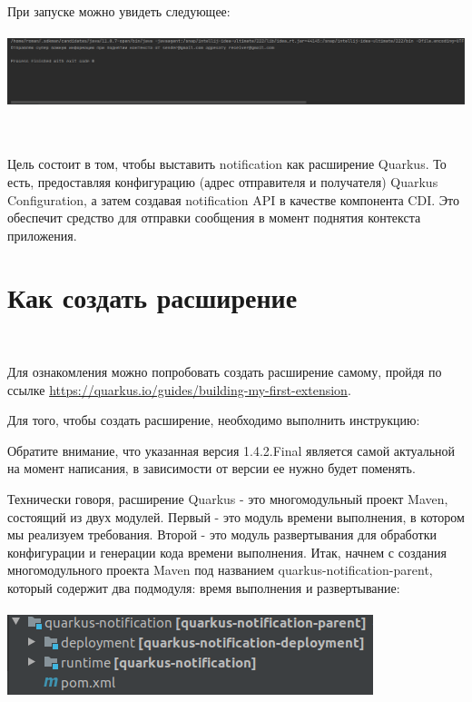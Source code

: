 \documentclass[russian,11pt]{article}
\begin{document}
При запуске можно увидеть следующее:

\paragraph{\includegraphics[scale=1.5, width=\textwidth]{2}}

~

Цель состоит в том, чтобы выставить notification как расширение Quarkus. То есть, предоставляя конфигурацию (адрес отправителя и получателя) Quarkus Configuration, а затем создавая notification  API в качестве компонента CDI. Это обеспечит средство для отправки сообщения в момент поднятия контекста приложения.

\section{Как создать расширение}
~

Для ознакомления можно попробовать создать расширение самому, пройдя по ссылке \url{https://quarkus.io/guides/building-my-first-extension}.
	
	Для того, чтобы создать расширение, необходимо выполнить инструкцию:



Обратите внимание, что указанная версия 1.4.2.Final является самой актуальной на момент написания, в зависимости от версии ее нужно будет поменять.

	Технически говоря, расширение Quarkus - это многомодульный проект Maven, состоящий из двух модулей. Первый - это модуль времени выполнения, в котором мы реализуем требования. Второй - это модуль развертывания для обработки конфигурации и генерации кода времени выполнения. Итак, начнем с создания многомодульного проекта Maven под названием quarkus-notification-parent, который содержит два подмодуля: время выполнения и развертывание:

\paragraph{\includegraphics[scale=1, width=\textwidth]{3}}
\end{document}
